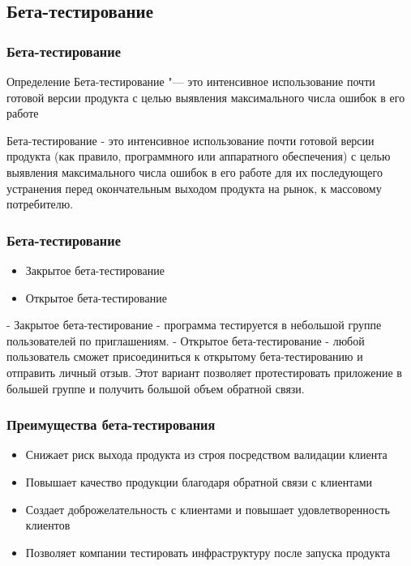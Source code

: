 \documentclass{../industrial-development}
\begin{document}
\subsection{Бета-тестирование}
\begin{frame} \frametitle{Бета-тестирование}
	\begin{block}{Определение}
		\alert{Бета-тестирование} "--- это интенсивное использование почти готовой версии продукта с целью выявления максимального числа ошибок в его работе
	\end{block}
\end{frame}

\lecturenotes
Бета-тестирование - это интенсивное использование почти готовой версии продукта (как правило, программного или аппаратного обеспечения) с целью выявления максимального числа ошибок в его работе для их последующего устранения перед окончательным выходом продукта на рынок, к массовому потребителю.

\begin{frame} \frametitle{Бета-тестирование}
	\begin{itemize}
		\item Закрытое бета-тестирование
		\item Открытое бета-тестирование
	\end{itemize}
\end{frame}

\lecturenotes
- Закрытое бета-тестирование - программа тестируется в небольшой группе пользователей по приглашениям.
- Открытое бета-тестирование - любой пользователь сможет присоединиться к открытому бета-тестированию и отправить личный отзыв. Этот вариант позволяет протестировать приложение в большей группе и получить большой объем обратной связи.

\begin{frame} \frametitle{Преимущества бета-тестирования}
	\begin{itemize}
		\item Снижает риск выхода продукта из строя посредством валидации клиента
		\item Повышает качество продукции благодаря обратной связи с клиентами
		\item Создает доброжелательность с клиентами и повышает удовлетворенность клиентов
		\item Позволяет компании тестировать инфраструктуру после запуска продукта
	\end{itemize}
\end{frame}
\end{document}
